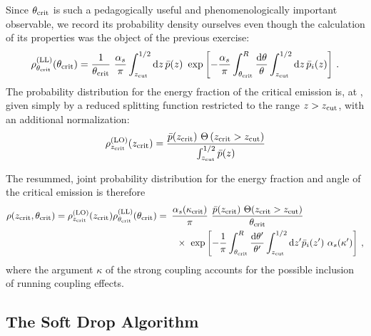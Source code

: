 Since \(\theta_{\rm crit}\) is such a pedagogically useful and phenomenologically important observable, we record its probability density ourselves even though the calculation of its properties was the object of the previous exercise:
\begin{equation}
   \rho^{\rm (LL)}_{\theta_{\rm crit}}(\theta_{\rm crit})
    =
    \frac{1}{\theta_{\rm crit}}
    ~
    \frac{\alpha_s}{\pi}
    \int_{z_{\rm cut}}^{1/2}
    \dd z\,
    \bar{p}(z)
    \,\,
    \exp\left[
        -\frac{\alpha_s}{\pi} \int_{\theta_{\rm crit}}^R
        \frac{\dd\theta}{\theta}
        \int_{z_{\rm cut}}^{1/2} \dd z\,
        \bar{p}_i(z)
    \right]
    \,.
\end{equation}
%
The probability distribution for the energy fraction of the critical emission is, at , given simply by a reduced splitting function restricted to the range \(z > z_{\rm cut}\), with an additional normalization:
\begin{align}
    \label{eq:constant-cutoff-zcrit}
    \rho^{\text{(LO)}}_{\zcrit}(\zcrit)
    =
    \frac{\bar{p}(\zcrit) \,\, \Theta\le(\zcrit > \zcut\ri)}
    {\int_{\zcut}^{1/2} \bar{p}(z)}
\end{align}


The resummed, joint probability distribution for the energy fraction and angle of the critical emission is therefore
\begin{align}
    \rho(z_{\rm crit}, \theta_{\rm crit})
    =
    \rho^{\text{(LO)}}_{z_{\rm crit}}(z_{\rm crit})
    \rho^{\text{(LL)}}_{\theta_{\rm crit}}(\theta_{\rm crit})
    =
    &
    \,\,\,
    \frac{\alpha_s(\kappa_{\rm crit})}{\pi}
    ~
    \frac{\bar{p}(z_{\rm crit}) \,\, \Theta(z_{\rm crit} > z_{\rm cut})}
        {\theta_{\rm crit}}
    \,\,
    \\
    &\quad
    \notag
    \times
    \,\,
    \exp\left[
    - \frac{1}{\pi}
    \int_{\theta_{\rm crit}}^R
    \frac{\dd\theta'}{\theta'}
    \int_{z_{\rm cut}}^{1/2} \dd z'
    \bar{p}_i(z')~
    \alpha_s(\kappa')
    \right]
    \,,
\end{align}
where the argument \(\kappa\) of the strong coupling accounts for the possible inclusion of running coupling effects.



\subsection{The Soft Drop Algorithm}
\label{sec:softdrop}

